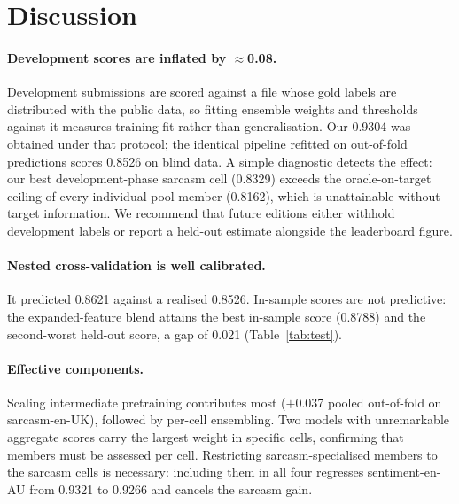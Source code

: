 \documentclass[11pt]{article}
\begin{document}
\section{Discussion}
\label{sec:analysis}

\paragraph{Development scores are inflated by $\approx$0.08.}
Development submissions are scored against a file whose gold labels are
distributed with the public data, so fitting ensemble weights and thresholds
against it measures training fit rather than generalisation. Our 0.9304 was
obtained under that protocol; the identical pipeline refitted on out-of-fold
predictions scores 0.8526 on blind data. A simple diagnostic detects the
effect: our best development-phase sarcasm cell (0.8329) exceeds the
oracle-on-target ceiling of every individual pool member (0.8162), which is
unattainable without target information. We recommend that future editions
either withhold development labels or report a held-out estimate alongside the
leaderboard figure.

\paragraph{Nested cross-validation is well calibrated.}
It predicted 0.8621 against a realised 0.8526. In-sample scores are not
predictive: the expanded-feature blend attains the best in-sample score
(0.8788) and the second-worst held-out score, a gap of 0.021
(Table~\ref{tab:test}).

\paragraph{Effective components.}
Scaling intermediate pretraining contributes most ($+$0.037 pooled
out-of-fold on sarcasm-en-UK), followed by per-cell ensembling. Two models
with unremarkable aggregate scores carry the largest weight in specific
cells, confirming that members must be assessed per cell. Restricting
sarcasm-specialised members to the sarcasm cells is necessary: including them
in all four regresses sentiment-en-AU from 0.9321 to 0.9266 and cancels the
sarcasm gain.
\end{document}
